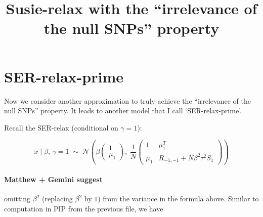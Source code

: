 \documentclass[11pt]{article}
\title{Susie-relax with the ``irrelevance of the null SNPs'' property}
\author{}
\date{}
\begin{document}
\maketitle

\section{SER-relax-prime}
Now we consider another approximation to truly achieve the ``irrelevance of the null SNPs'' property. It leads to another model that I call `SER-relax-prime'.

Recall the SER-relax (conditional on $\gamma = 1$):

\begin{equation}\label{eq:SER-gamma-1}
x \mid \beta,\,\gamma=1 \;\sim\;
\mathcal{N}\!\left(
  \beta\begin{pmatrix}1\\\mu_1\end{pmatrix},\;
  \frac{1}{N}\begin{pmatrix}1 & \mu_1^T \\ \mu_1 & \bar{R}_{-1,-1}+N\beta^2\tau^2 S_1\end{pmatrix}
\right)
\end{equation}
\paragraph{Matthew + Gemini suggest} omitting $\beta^2$ (replacing $\beta^2$ by $1$) from the variance in the formula above. Similar to computation in PIP from the previous file, we have
\end{document}
